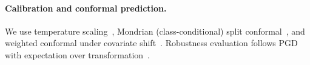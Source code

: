 \paragraph{Calibration and conformal prediction.} We use temperature scaling~\cite{guo2017calibration}, Mondrian (class-conditional) split conformal~\cite{vovk2005alrw}, and weighted conformal under covariate shift~\cite{tibshirani2019weighted}. Robustness evaluation follows PGD~\cite{madry2018pgd} with expectation over transformation~\cite{athalye2018eot}.

